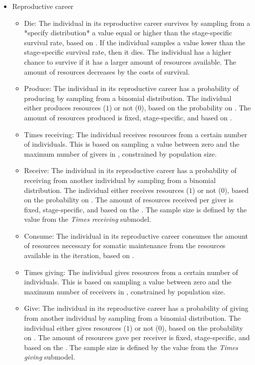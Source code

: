 \documentclass{article}
\begin{document}
\begin{itemize}
\begin{itemize}
\begin{itemize}
        \end{itemize}
    \end{itemize}
    \item Reproductive career
    \begin{itemize}
        \item Die: The individual in its reproductive career survives by sampling from a *specify distribution* a value equal or higher than the stage-specific survival rate, based on \cite{gurven2007longevity}. If the individual samples a value lower than the stage-specific survival rate, then it dies. The individual has a higher chance to survive if it has a larger amount of resources available. The amount of resources decreases by the costs of survival.
        \item Produce: The individual in its reproductive career has a probability of producing by sampling from a binomial distribution. The individual either produces resources ($1$) or not ($0$), based on the probability on \cite{koster2020life}. The amount of resources produced is fixed, stage-specific, and based on \cite{koster2020life}.
        \item Times receiving: The individual receives resources from a certain number of individuals. This is based on sampling a value between zero and the maximum number of givers in \cite{gurven2004give}, constrained by population size.
        \item Receive: The individual in its reproductive career has a probability of receiving from another individual by sampling from a binomial distribution. The individual either receives resources ($1$) or not ($0$), based on the probability on \cite{gurven2004give}. The amount of resources received per giver is fixed, stage-specific, and based on the \cite{gurven2004give}. The sample size is defined by the value from the \emph{Times receiving} submodel. 
        \item Consume: The individual in its reproductive career consumes the amount of resources necessary for somatic maintenance from the resources available in the iteration, based on \cite{kaplan2000theory}.
        \item Times giving: The individual gives resources from a certain number of individuals. This is based on sampling a value between zero and the maximum number of receivers in \cite{gurven2004give}, constrained by population size.
        \item Give: The individual in its reproductive career has a probability of giving from another individual by sampling from a binomial distribution. The individual either gives resources ($1$) or not ($0$), based on the probability on \cite{gurven2004give}. The amount of resources gave per receiver is fixed, stage-specific, and based on the \cite{gurven2004give}. The sample size is defined by the value from the \emph{Times giving} submodel. 

\end{itemize}
\end{itemize}
\end{document}
